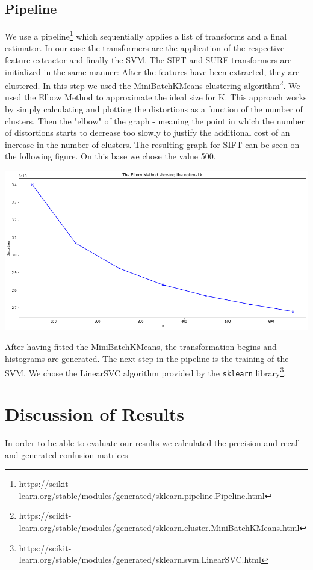 \documentclass{scrartcl}
\begin{document}
\subsection{Pipeline}
We use a pipeline\footnote{https://scikit-learn.org/stable/modules/generated/sklearn.pipeline.Pipeline.html} which sequentially applies a list of transforms and a final estimator.
In our case the transformers are the application of the respective feature extractor and finally the SVM.
The SIFT and SURF transformers are initialized in the same manner: After the features have been extracted, they are clustered.
In this step we used the MiniBatchKMeans clustering algorithm\footnote{https://scikit-learn.org/stable/modules/generated/sklearn.cluster.MiniBatchKMeans.html}. We used the Elbow Method to approximate the ideal size for K.
This approach works by simply calculating and plotting the distortions as a function of the number of clusters. Then the "elbow" of the graph - meaning the point in which the number of distortions starts to decrease too slowly to justify the additional cost of an increase in the number of clusters. The resulting graph for SIFT can be seen on the following figure. On this base we chose the value 500. 
\begin{center}
  \includegraphics[scale=0.3]{img/kmeans-sift}
\end{center}
After having fitted the MiniBatchKMeans, the transformation begins and histograms are generated.
The next step in the pipeline is the training of the SVM. We chose the LinearSVC algorithm provided by the \texttt{sklearn} library\footnote{https://scikit-learn.org/stable/modules/generated/sklearn.svm.LinearSVC.html}.


\section{Discussion of Results}
In order to be able to evaluate our results we calculated the precision and recall and generated confusion matrices




\end{document}
